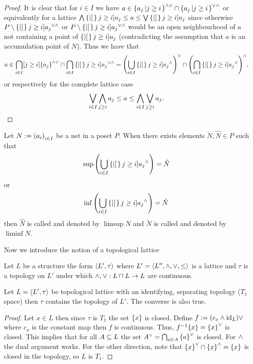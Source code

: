 \documentclass[8pt,a4paper]{article}
\begin{document}
\begin{proof}
    It is clear that for $i\in I$ we have $a\in\set{a_j}[j \geq i]^{\meet\join}\setmeet\set{a_j}[j \geq i]^{\join\meet}$ or equivalently for a lattice $\Meet\set[j \geq i]{a_j}\leq a\leq \Join\set[j \geq i]{a_j}$ since otherwise
    $P\setminus\set[j \geq i]{a_j}^{\join\meet}$ or $P\setminus\set[j \geq i]{a_j}^{\join\meet}$ would be an open neighbourhood of $a$ not containing a point of $\set[j\geq i]{a_j}$ (contradicting the assumption that $a$ is an accumulation point of $N$).
    Thus we have that
    $$
    a\in \Setmeet_{i\in I}[j \geq i]{\set{a_j}^{\meet\join}}\setmeet\Setmeet_{i\in I}\set[j \geq i]{a_j}^{\join\meet}=
    {\left(\Setjoin_{i\in I}{\set[j \geq i]{a_j}^{\meet}}\right)}^{\join}\setmeet{\left(\Setmeet_{i\in I}\set[j \geq i]{a_j}^{\join}\right)}^{\meet},
    $$
    or respectively for the complete lattice case
    $$
    \mathop\mathrm{\bigvee}_{i\in I}\mathop\mathrm{\bigwedge}_{j\geq i}{a_j}\leq a\leq \mathop\mathrm{\bigwedge}_{i\in I}\mathop\mathrm{\bigvee}_{j\geq i}{a_j}.
    $$
\end{proof}

\begin{definition}
    Let $N:=\net[i\in I]{a_i}$ be a net in a poset $P$. When there exists elements $\check{N},\hat{N}\in P$ such that
    $$
    \sup{\left(\Setjoin_{i\in I}{\set[j \geq i]{a_j}^{\meet}}\right)}=\hat{N}
    $$
    or
    $$
    \inf{\left(\Setjoin_{i\in I}{\set[j \geq i]{a_j}^{\meet}}\right)}=\check{N}
    $$
    then $\hat{N}$ is called  and denoted by $\limsup{N}$ and $\check{N}$ is called  and denoted by $\liminf{N}$.
\end{definition}

Now we introduce the notion of a topological lattice

\begin{definition}
    Let $L$ be a structure the form $\struct{L',\tau}$ where $L'=\struct{L'',\meet,\join,\leq}$ is a lattice and $\tau$ is a topology on $L'$ under which $\wedge, \vee:L\mathbin{\sqcap} L \rightarrow L$ are continuous.
\end{definition}

\begin{lemma}
    Let $L=\struct{L',\tau}$ be topological lattice with an identifying, separating topology ($T_1$ space) then $\tau$ contains the  topology of $L'$. The converse is also true.
\end{lemma}

\begin{proof}
    Let $x\in L$ then since $\tau$ is $T_1$ the set $\set{x}$ is closed. Define $f:=(c_x\wedge\mathop\mathrm{id}\nolimits_L)\vee$ where $c_x$ is the constant map then $f$ is continuous. Thus, $f^{-1}{\set{x}}=\set{x}^{\join}$ is closed. This implies that for all $A\subseteq L$ the set $A^{\join}=\Setmeet_{a\in A}{\set{a}^{\join}}$ is closed. For $\wedge$ the dual argument works.
    For the other direction, note that $\set{x}^\join\setmeet\set{x}^{\meet}=\set{x}$ is closed in the  topology, so $L$ is $T_1$.
\end{proof}
\end{document}
